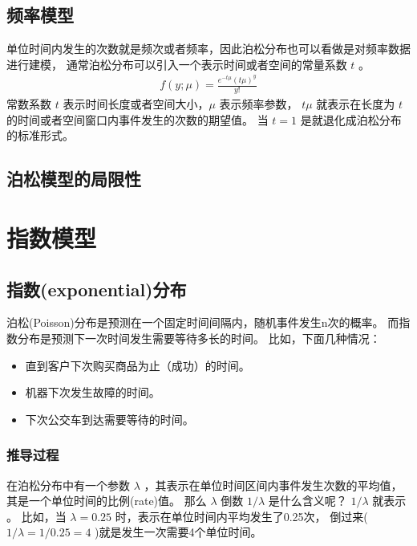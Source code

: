 \documentclass[letterpaper,10pt,english]{sphinxmanual}
\begin{document}
\section{频率模型}
\label{\detokenize{_u6cca_u677e_u6a21_u578b/content:id8}}
单位时间内发生的次数就是频次或者频率，因此泊松分布也可以看做是对频率数据进行建模，
通常泊松分布可以引入一个表示时间或者空间的常量系数 \(t\) 。
\begin{equation}\label{equation:泊松模型/content:泊松模型/content:18}
\begin{split}f(y;\mu) = \frac{e^{-t\mu} (t\mu)^{y}}{y!}\end{split}
\end{equation}
常数系数 \(t\) 表示时间长度或者空间大小，\(\mu\) 表示频率参数，
\(t\mu\) 就表示在长度为 \(t\) 的时间或者空间窗口内事件发生的次数的期望值。
当 \(t=1\) 是就退化成泊松分布的标准形式。


\section{泊松模型的局限性}
\label{\detokenize{_u6cca_u677e_u6a21_u578b/content:id9}}

\chapter{指数模型}
\label{\detokenize{_u6307_u6570_u6a21_u578b/content:id1}}\label{\detokenize{_u6307_u6570_u6a21_u578b/content::doc}}

\section{指数(exponential)分布}
\label{\detokenize{_u6307_u6570_u6a21_u578b/content:exponential}}\label{\detokenize{_u6307_u6570_u6a21_u578b/content:ch-common-distribution-exponential}}
泊松(Poisson)分布是预测在一个固定时间间隔内，随机事件发生n次的概率。
而指数分布是预测下一次时间发生需要等待多长的时间。
比如，下面几种情况：
\begin{itemize}
\item {} 
直到客户下次购买商品为止（成功）的时间。

\item {} 
机器下次发生故障的时间。

\item {} 
下次公交车到达需要等待的时间。

\end{itemize}


\subsection{推导过程}
\label{\detokenize{_u6307_u6570_u6a21_u578b/content:id2}}
在泊松分布中有一个参数 \(\lambda\) ，其表示在单位时间区间内事件发生次数的平均值，
其是一个单位时间的比例(rate)值。
那么  \(\lambda\) 倒数 \(1/\lambda\) 是什么含义呢？
\(1/\lambda\) 就表示 。
比如，当 \(\lambda=0.25\) 时，表示在单位时间内平均发生了0.25次，
倒过来( \(1/\lambda=1/0.25=4\) )就是发生一次需要4个单位时间。
\end{document}
